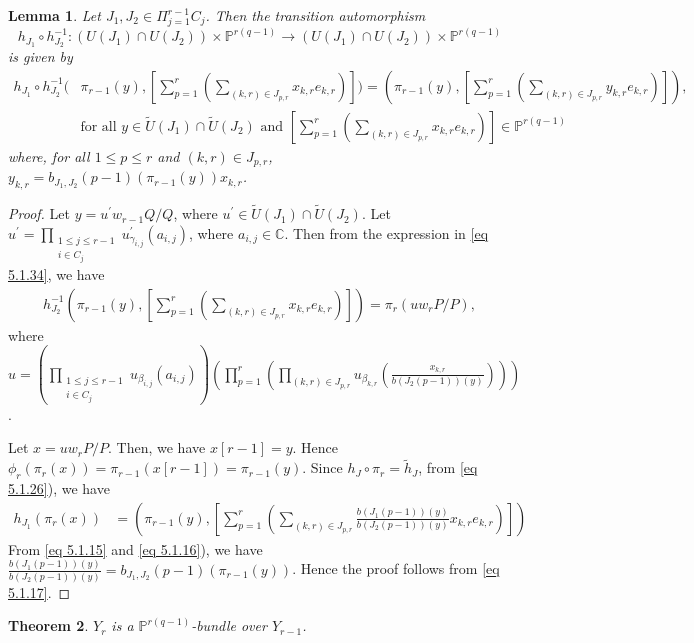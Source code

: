 \documentclass[12pt,reqno]{amsart}
\numberwithin{equation}{section}
\newtheorem{theorem}{Theorem}[section]
\newtheorem{lemma}[theorem]{Lemma}
\theoremstyle{definition}
\begin{document}
		\begin{lemma} \label{section:quotient:lemma 12}
			Let $J_{1},J_{2}\in \Pi_{j=1}^{r-1}C_{j}$. Then the transition automorphism
			$$h_{J_{1}}\circ h_{J_{2}}^{-1}:(U(J_{1})\cap U(J_{2}))\times \mathbb{P}^{r(q-1)}\longrightarrow (U(J_{1})\cap U(J_{2}))\times \mathbb{P}^{r(q-1)}$$ is given by 	 \begin{align*}
				h_{J_{1}}\circ h_{J_{2}}^{-1}(&\pi_{r-1}(y),[\sum_{p=1}^{r}(\sum_{(k,r)\in J_{p,r}}x_{k,r}e_{k,r})])=(\pi_{r-1}(y),[\sum_{p=1}^{r}(\sum_{(k,r)\in J_{p,r}}y_{k,r}e_{k,r})]),\\&\text{for all $y\in \tilde{U}(J_{1})\cap \tilde{U}(J_{2})$ and $[\sum_{p=1}^{r}(\sum_{(k,r)\in J_{p,r}}x_{k,r}e_{k,r})]\in\mathbb{P}^{r(q-1)}$}
			\end{align*}
			where, for all $1\leq p\leq r$ and $(k,r)\in J_{p,r}$,
			$y_{k,r}=b_{J_{1},J_{2}}(p-1)(\pi_{r-1}(y))x_{k,r}$.
		\end{lemma}
		\begin{proof}Let $y=u^{\prime}w_{r-1}Q/Q$, where $u^{\prime}\in \tilde{U}(J_{1})\cap\tilde{U}(J_{2})$. Let $u^{\prime}=\prod_{\substack{1\leq j\leq r-1\\i\in C_{j}}}u^{\prime}_{\gamma_{i,j}}(a_{i,j})$, where $a_{i,j}\in\mathbb{C}$. Then from the expression in \cref{eq 5.1.34}, we have \begin{align*}
				h_{J_{2}}^{-1}(\pi_{r-1}(y),[\sum_{p=1}^{r}(\sum_{(k,r)\in J_{p,r}}x_{k,r}e_{k,r})])=\pi_{r}(uw_{r}P/P),
			\end{align*}
			where 
			$u=(\prod_{\substack{1\leq j\leq r-1\\i\in C_{j}}}u_{\beta_{i,j}}(a_{i,j}))(\prod_{p=1}^{r}(\prod_{(k,r)\in J_{p,r}}u_{\beta_{k,r}}(\frac{x_{k,r}}{b(J_{2}(p-1))(y)})))$.
			
			Let $x=uw_{r}P/P$. Then, we have $x[r-1]=y$. Hence $\phi_{r}(\pi_{r}(x))=\pi_{r-1}(x[r-1])=\pi_{r-1}(y)$. Since $h_{J}\circ\pi_{r}=\tilde{h}_{J}$, from \cref{eq 5.1.26}), we have 
			\begin{align}\label{eq 5.1.17}
				h_{J_{1}}(\pi_{r}(x))&=(\pi_{r-1}(y),[\sum_{p=1}^{r}(\sum_{(k,r)\in J_{p,r}}\frac{b(J_{1}(p-1))(y)}{b(J_{2}(p-1))(y)}x_{k,r}e_{k,r})])
			\end{align}
			From \cref{eq 5.1.15} and \cref{eq 5.1.16}), we have $\frac{b(J_{1}(p-1))(y)}{b(J_{2}(p-1))(y)}= b_{J_{1},J_{2}}(p-1)(\pi_{r-1}(y))$. Hence the proof follows from \cref{eq 5.1.17}.
		\end{proof}
		\begin{theorem}\label{main result 1}
			$Y_{r}$ is a $\mathbb{P}^{r(q-1)}$-bundle over $Y_{r-1}$.
		\end{theorem}
\end{document}
